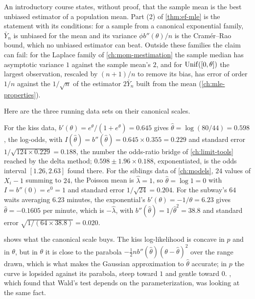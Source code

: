 \begin{bridge}
An introductory course states, without proof, that the sample mean is the best unbiased estimator of a population mean. Part (2) of \cref{thm:ef-mle} is the statement with its conditions: for a sample from a canonical exponential family, $\bar{Y}_n$ is unbiased for the mean and its variance $\phi b''(\theta)/n$ is the Cram\'er--Rao bound, which no unbiased estimator can beat. Outside these families the claim can fail: for the Laplace family of \cref{ch:mom-mestimation} the sample median has asymptotic variance $1$ against the sample mean's $2$, and for $\mathrm{Unif}([0, \theta])$ the largest observation, rescaled by $(n+1)/n$ to remove its bias, has error of order $1/n$ against the $1/\sqrt{n}$ of the estimator $2\bar{Y}_n$ built from the mean (\cref{ch:mle-properties}).
\end{bridge}

Here are the three running data sets on their canonical scales.

\begin{worked}
For the kiss data, $b'(\theta) = e^\theta/(1 + e^\theta) = 0.645$ gives $\hat{\theta} = \log(80/44) = 0.598$, the log-odds, with $I(\hat{\theta}) = b''(\hat{\theta}) = 0.645 \times 0.355 = 0.229$ and standard error $1/\sqrt{124 \times 0.229} = 0.188$, the number the odds-ratio bridge of \cref{ch:limit-tools} reached by the delta method; $0.598 \pm 1.96 \times 0.188$, exponentiated, is the odds interval $[1.26, 2.63]$ found there. For the siblings data of \cref{ch:models}, $24$ values of $X_i - 1$ summing to $24$, the Poisson mean is $\hat{\lambda} = 1$, so $\hat{\theta} = \log 1 = 0$ with $I = b''(0) = e^0 = 1$ and standard error $1/\sqrt{24} = 0.204$. For the subway's $64$ waits averaging $6.23$ minutes, the exponential's $b'(\theta) = -1/\theta = 6.23$ gives $\hat{\theta} = -0.1605$ per minute, which is $-\hat{\lambda}$, with $b''(\hat\theta) = 1/\hat\theta^2 = 38.8$ and standard error $\sqrt{1/(64 \times 38.8)} = 0.020$.
\end{worked}

 shows what the canonical scale buys.
The kiss log-likelihood is concave in $p$ and in $\theta$, but in $\theta$ it is close to the parabola $-\frac12 n b''(\hat{\theta})(\theta - \hat{\theta})^2$ over the range drawn, which is what makes the Gaussian approximation to $\hat{\theta}$ accurate; in $p$ the curve is lopsided against its parabola, steep toward $1$ and gentle toward $0$.
, which found that Wald's test depends on the parameterization, was looking at the same fact.

